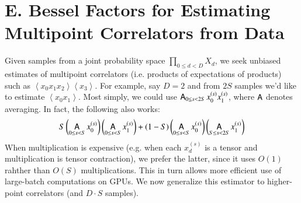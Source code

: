\documentclass{article}
\newcommand{\wrap}[1]{\left(#1\right)}
\newcommand{\wang}[1]{\left\langle#1\right\rangle}
\DeclareMathOperator*{\Avg}{\text{\sffamily A}}
\begin{document}
\section*{E. Bessel Factors for Estimating Multipoint Correlators from Data}
    Given samples from a joint probability space $\prod_{0\leq d<D} X_d$, we
    seek unbiased estimates of multipoint correlators (i.e. products of
    expectations of products) such as $\wang{x_0 x_1 x_2}\wang{x_3}$.  For
    example, say $D=2$ and from $2S$ samples we'd like to estimate $\wang{x_0
    x_1}$.  Most simply, we could use $\Avg_{0\leq s<2S} x_0^{(s)} x_1^{(s)}$,
    where $\Avg$ denotes averaging.  In fact, the following also works:
    \begin{equation} \label{eq:bessel}
        S
        \wrap{\Avg_{0\leq s< S} x_0^{(s)}}
        \wrap{\Avg_{0\leq s< S} x_1^{(s)}}
        +
        (1-S)
        \wrap{\Avg_{0\leq s< S} x_0^{(s)}}
        \wrap{\Avg_{S\leq s<2S} x_1^{(s)}}
    \end{equation}
    When multiplication is expensive (e.g. when each $x_d^{(s)}$ is a tensor
    and multiplication is tensor contraction), we prefer the latter, since it
    uses $O(1)$ rahther than $O(S)$ multiplications.  This in turn allows more
    efficient use of large-batch computations on GPUs.  We now generalize this
    estimator to higher-point correlators (and $D\cdot S$ samples).
\end{document}
